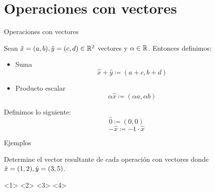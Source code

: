 	\section{Operaciones con vectores}
    \begin{frame}{Operaciones con vectores}
        \begin{mdefinition}
            Sean $\hat{x}=(a,b),\hat{y}=(c,d)\in\rmath[2]$ vectores y $\alpha\in\rmath$. Entonces definimos:
            \begin{itemize}
                \item Suma \[\hat{x}+\hat{y}\coloneqq(a+c,b+d)\]
                \begin{figure}
                    \centering
                \end{figure}
                \item Producto escalar \[\alpha\hat{x}\coloneqq(\alpha a,\alpha b)\]
                \begin{figure}
                    \centering
                \end{figure}
            \end{itemize}
        \end{mdefinition}
    \end{frame}
    \begin{frame}
        \begin{remark}
        Definimos lo siguiente:
        \[ \hat{0}\coloneqq(0,0)\]
        \[-\hat{x}\coloneqq-1\cdot\hat{x}\]
        \end{remark}
    \end{frame}
    \begin{frame}{Ejemplos}
        \begin{example}
            Determine el vector resultante de cada operación con vectores donde $\ds\hat{x}=(1,2),\hat{y}=(3,5)$.
            \begin{itemize}
                <1>
                <2>
                <3>
                <4>
            \end{itemize}
        \end{example}
    \end{frame}
